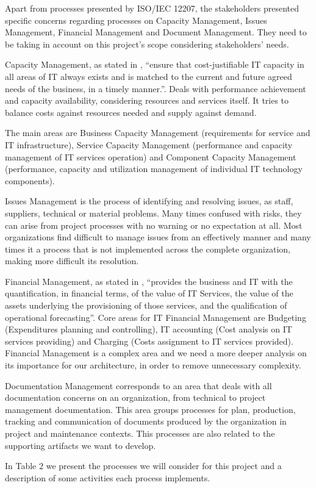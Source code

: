 Apart from processes presented by ISO/IEC 12207, the stakeholders presented specific concerns regarding processes on Capacity Management, Issues Management, Financial Management and Document Management. They need to be taking in account on this project's scope considering stakeholders' needs.\par
Capacity Management, as stated in \cite{itilSD}, ``ensure that cost-justifiable IT capacity in all areas of IT always exists and is matched to the current and future agreed needs of the business, in a timely manner.''. Deals with performance achievement and capacity availability, considering resources and services itself. It tries to balance costs against resources needed and supply against demand.\par
The main areas are Business Capacity Management (requirements for service and IT infrastructure), Service Capacity Management (performance and capacity management of IT services operation) and Component Capacity Management (performance, capacity and utilization management of individual IT technology components).\par
Issues Management is the process of identifying and resolving issues, as staff, suppliers, technical or material problems. Many times confused with risks, they can arise from project processes with no warning or no expectation at all. Most organizations find difficult to manage issues from an effectively manner and many times it a process that is not implemented across the complete organization, making more difficult its resolution.\par
Financial Management, as stated in \cite{itilSS}, ``provides the business and IT with the quantification, in financial terms, of the value of IT Services, the value of the assets underlying the provisioning of those services, and the qualification of operational forecasting''. Core areas for IT Financial Management are Budgeting (Expenditures planning and controlling), IT accounting (Cost analysis on IT services providing) and Charging (Costs assignment to IT services provided). Financial Management is a complex area and we need a more deeper analysis on its importance for our architecture, in order to remove unnecessary complexity.\par
Documentation Management corresponds to an area that deals with all documentation concerns on an organization, from technical to project management documentation. This area groups processes for plan, production, tracking and communication of documents produced by the organization in project and maintenance contexts. This processes are also related to the supporting artifacts we want to develop.\par
In Table 2 we present the processes we will consider for this project and a description of some activities each process implements.

